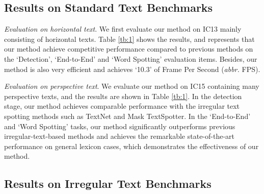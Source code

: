 \documentclass[letterpaper]{article} \usepackage{aaai20}  \usepackage{times}  \usepackage{helvet} \usepackage{courier}  \usepackage[hyphens]{url}  \usepackage{graphicx} \urlstyle{rm} \def\UrlFont{\rm}  \usepackage{graphicx}  \frenchspacing  \setlength{\pdfpagewidth}{8.5in}  \setlength{\pdfpageheight}{11in}  \usepackage{amsmath}
\begin{document}
\subsection{Results on Standard Text Benchmarks}

\emph{Evaluation on horizontal text}.
We first evaluate our method on IC13 mainly consisting of horizontal texts.
Table \ref{tb:1} shows the results, and represents that our method achieve competitive performance compared to previous methods on the `Detection', `End-to-End' and `Word Spotting' evaluation items.
Besides, our method is also very efficient and achieves `10.3' of Frame Per Second (\emph{abbr.} FPS).

\emph{Evaluation on perspective text}.
We evaluate our method on IC15 containing many perspective texts, and the results are shown in Table \ref{tb:1}.
In the detection stage, our method achieves comparable performance with the irregular text spotting methods such as TextNet and Mask TextSpotter.
In the `End-to-End' and `Word Spotting' tasks, our method significantly outperforms previous irregular-text-based methods and achieves the remarkable state-of-the-art performance on general lexicon cases, which demonstrates the effectiveness of our method.

\subsection{Results on Irregular Text Benchmarks}
\end{document}
